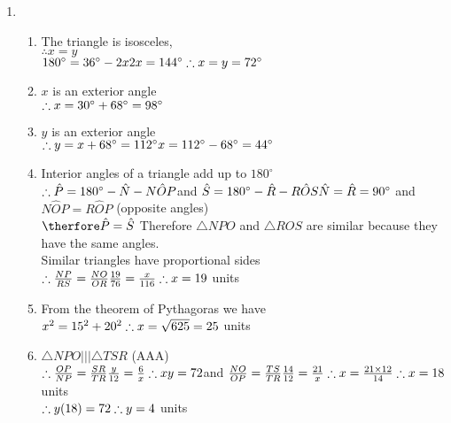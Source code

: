  \begin{solutions}{}{
\begin{enumerate}[itemsep=5pt, label=\textbf{\arabic*}. ] 


\item %
      \begin{enumerate}[noitemsep, label=\textbf{(\alph*)} ]
\item The triangle is isosceles,\\ $\therefore x=y$\\
$180^{\circ} = 36^{\circ}-2x\\
2x=144^{\circ}\\
\therefore x=y=72^{\circ}$
\item $x$ is an exterior angle\\
$\therefore x=30^{\circ}+68^{\circ} \\
=98^{\circ}$
\item $y$ is an exterior angle\\
$\therefore y = x+68^{\circ}= 112^{\circ}\\
x=112^{\circ}-68^{\circ} = 44^{\circ}$
\item Interior angles of a triangle add up to $180^{\circ}$\\
$\therefore \hat{P} = 180^{\circ} - \hat{N} - N\hat{O}P\\
$and $\hat{S} = 180^{\circ} - \hat{R} - R\hat{O}S\\
\hat{N} = \hat{R} = 90^{\circ}$ and $N\hat{O}P = R\hat{O}P$ (opposite angles)\\
$\therfore \hat{P} = \hat{S}\\$
Therefore $\triangle NPO$ and $\triangle ROS$ are similar because they have the same angles.\\
Similar triangles have proportional sides\\
$\therefore \frac{NP}{RS} = \frac{NO}{OR}\\
\frac{19}{76}=\frac{x}{116}\\
\therefore x = 19$ units

 
\item From the theorem of Pythagoras we have\\
$x^2 = 15^2 + 20^2\\
\therefore x = \sqrt{625}\\
=25$ units
\item $\triangle NPO ||| \triangle TSR$ (AAA)\\
$\therefore \frac{OP}{NP} = \frac{SR}{TR}\\
\frac{y}{12}=\frac{6}{x}\\
\therefore xy=72\\
$and $\frac{NO}{OP} = \frac{TS}{TR}\\
\frac{14}{12} = \frac{21}{x}\\
\therefore x = \frac{21 \times 12}{14}\\
\therefore x = 18$ units\\
$\therefore y(18)=72\\
\therefore y=4$ units



\end{enumerate}
\end{enumerate}}
\end{solutions}
